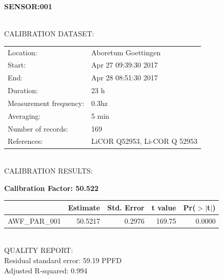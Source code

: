 \documentclass[oneside]{report}
\begin{document}
\pagebreak


\begin{center}
\large{\textbf{SENSOR:001}}\\
\end{center}

\hrulefill\\
CALIBRATION DATASET:\\
\begin{table}[h!]
  \centering
  \label{tab:table1}
  \begin{tabular}{ll}
    Location: & Aboretum Goettingen\\ 
    
    
    Start:  & Apr 27 09:39:30 2017 \\
    End:   & Apr 28 08:51:30 2017\\ 
    Duration: & 23 h\\
    Measurement frequency: & 0.3hz\\
    Averaging:  &5 min\\
    Number of records: & 169 \\
    References: & LiCOR Q52953, Li-COR Q 52953 \\
  \end{tabular}
\end{table}

\hrulefill\\
CALIBRATION RESULTS:\\


\begin{center}
\textbf{\large{Calibration Factor: 50.522}}\\
\end{center}
\begin{table}[ht]
\centering
\begin{tabular}{rrrrr}
  \hline
 & Estimate & Std. Error & t value & Pr($>$$|$t$|$) \\ 
  \hline
AWF\_PAR\_001 & 50.5217 & 0.2976 & 169.75 & 0.0000 \\ 
   \hline
\end{tabular}
\end{table}



\hrulefill\\
QUALITY REPORT:\\
Residual standard error: 59.19 PPFD\\
Adjusted R-squared: 0.994
\end{document}
